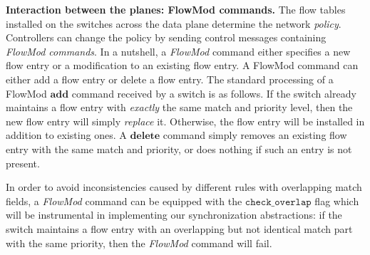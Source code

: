 \documentclass{sig-alternate-2006}
\newcommand{\add}{\textbf{add}\xspace}
\newcommand{\dele}{\textbf{delete}\xspace}
\newcommand{\checko}{\texttt{check\_overlap}\xspace}
\newcommand{\liron}[1]{\textit{\textcolor{mypurple}{[liron]: #1}}} %
\newcommand{\petr}[1]{\textit{\textcolor{blue}{[petr]: #1}}} %
\begin{document}
\vspace{1mm}
\noindent\textbf{Interaction between the planes: FlowMod commands.}
The flow tables installed on the switches across the data plane
determine the network \emph{policy}.
Controllers can change the policy by sending
control messages containing \emph{FlowMod commands}.
In a nutshell, a \emph{FlowMod} command either specifies a new flow entry or
a modification to an existing flow entry.
%
%
%
%
A FlowMod command can either add a flow entry or delete a flow entry.
The standard processing of a FlowMod $\add$ command received by a switch is
as follows.
If the switch already maintains a flow entry with \emph{exactly} the
same match and priority level, then the new flow entry will simply \emph{replace} it.
Otherwise, the flow entry will be installed in addition to existing
ones.
A $\dele$ command simply removes an existing flow entry with the same
match and priority,  or does nothing if such an entry is not present.



In order to avoid inconsistencies caused by different rules with
overlapping match fields, a \emph{FlowMod} command can be equipped with 
the $\checko$ flag which will be instrumental
in implementing our synchronization abstractions:
if the switch maintains a flow entry with an overlapping but not
identical match part with the same priority, then
the \emph{FlowMod} command will fail.
\end{document}
